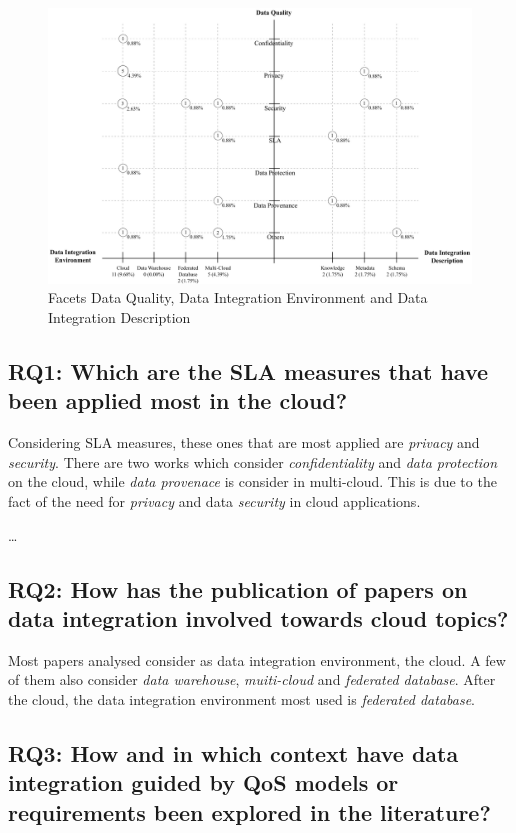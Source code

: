 \begin{figure}[!h]
\centering
\includegraphics[scale=0.53]{figs/bubble-charts/Data-Quality-DI.pdf}
\caption{Facets Data Quality, Data Integration Environment and Data Integration Description}\label{fig:facet4}
\end{figure}

\subsection{RQ1: Which are the SLA measures that have been applied most in
the cloud?}

Considering SLA measures, these ones that are most applied are \textit{privacy}
and \textit{security}. There are two works which consider
\textit{confidentiality} and \textit{data protection} on the cloud, while
\textit{data provenace} is consider in multi-cloud. This is due to the fact of
the need for \textit{privacy} and data \textit{security} in cloud applications.

\ldots

\subsection{RQ2: How has the publication of papers on data integration
involved towards cloud topics?}

Most papers analysed consider as data integration environment, the cloud. A few
of them also consider \textit{data warehouse}, \textit{muiti-cloud} and
\textit{federated database}. After the cloud, the data integration environment
most used is \textit{federated database}. 



\subsection{RQ3: How and in which context have data integration guided by QoS
models or requirements been explored in the literature?}

